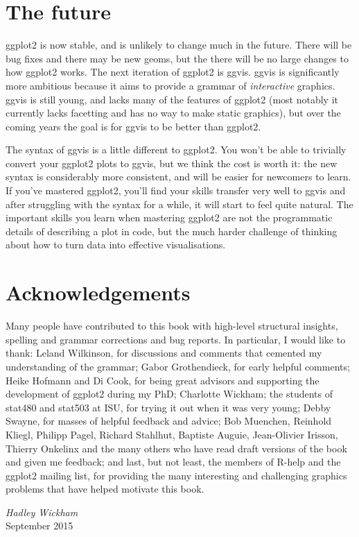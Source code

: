 \section*{The future}

ggplot2 is now stable, and is unlikely to change much in the future.
There will be bug fixes and there may be new geoms, but the there will
be no large changes to how ggplot2 works. The next iteration of ggplot2
is ggvis. ggvis is significantly more ambitious because it aims to
provide a grammar of \emph{interactive} graphics. ggvis is still young,
and lacks many of the features of ggplot2 (most notably it currently
lacks facetting and has no way to make static graphics), but over the
coming years the goal is for ggvis to be better than ggplot2.

The syntax of ggvis is a little different to ggplot2. You won't be able
to trivially convert your ggplot2 plots to ggvis, but we think the cost
is worth it: the new syntax is considerably more consistent, and will be
easier for newcomers to learn. If you've mastered ggplot2, you'll find
your skills transfer very well to ggvis and after struggling with the
syntax for a while, it will start to feel quite natural. The important
skills you learn when mastering ggplot2 are not the programmatic details
of describing a plot in code, but the much harder challenge of thinking
about how to turn data into effective visualisations.

\section*{Acknowledgements}

Many people have contributed to this book with high-level structural
insights, spelling and grammar corrections and bug reports. In
particular, I would like to thank: Leland Wilkinson, for discussions and
comments that cemented my understanding of the grammar; Gabor
Grothendieck, for early helpful comments; Heike Hofmann and Di Cook, for
being great advisors and supporting the development of ggplot2 during my
PhD; Charlotte Wickham; the students of stat480 and stat503 at ISU, for
trying it out when it was very young; Debby Swayne, for masses of
helpful feedback and advice; Bob Muenchen, Reinhold Kliegl, Philipp
Pagel, Richard Stahlhut, Baptiste Auguie, Jean-Olivier Irisson, Thierry
Onkelinx and the many others who have read draft versions of the book
and given me feedback; and last, but not least, the members of R-help
and the ggplot2 mailing list, for providing the many interesting and
challenging graphics problems that have helped motivate this book.

\vspace{\baselineskip}\begin{flushright}\noindent
{\it Hadley Wickham}\\
September 2015\\
\end{flushright}
